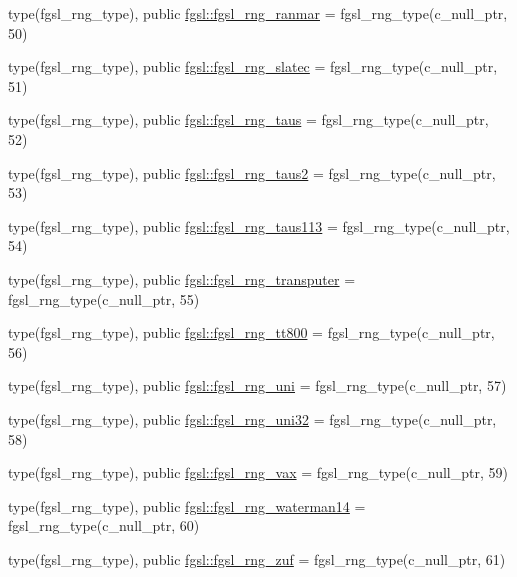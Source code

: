 \begin{DoxyCompactItemize}
type(fgsl\+\_\+rng\+\_\+type), public \hyperlink{namespacefgsl_a099ffd8b436045a9bd570027a1406df4}{fgsl\+::fgsl\+\_\+rng\+\_\+ranmar} = fgsl\+\_\+rng\+\_\+type(c\+\_\+null\+\_\+ptr, 50)
\item 
type(fgsl\+\_\+rng\+\_\+type), public \hyperlink{namespacefgsl_aa8d0035b0617f463167b9fce7aeedd26}{fgsl\+::fgsl\+\_\+rng\+\_\+slatec} = fgsl\+\_\+rng\+\_\+type(c\+\_\+null\+\_\+ptr, 51)
\item 
type(fgsl\+\_\+rng\+\_\+type), public \hyperlink{namespacefgsl_a9fe9a6cae0f833d90b9c22d644165758}{fgsl\+::fgsl\+\_\+rng\+\_\+taus} = fgsl\+\_\+rng\+\_\+type(c\+\_\+null\+\_\+ptr, 52)
\item 
type(fgsl\+\_\+rng\+\_\+type), public \hyperlink{namespacefgsl_a49b9837652787069b7179152078a6c9d}{fgsl\+::fgsl\+\_\+rng\+\_\+taus2} = fgsl\+\_\+rng\+\_\+type(c\+\_\+null\+\_\+ptr, 53)
\item 
type(fgsl\+\_\+rng\+\_\+type), public \hyperlink{namespacefgsl_a4b4cf5cdf021417e3147d6efff412544}{fgsl\+::fgsl\+\_\+rng\+\_\+taus113} = fgsl\+\_\+rng\+\_\+type(c\+\_\+null\+\_\+ptr, 54)
\item 
type(fgsl\+\_\+rng\+\_\+type), public \hyperlink{namespacefgsl_ae6f6fd654d8c94d4ff5cf3a3eb274ccb}{fgsl\+::fgsl\+\_\+rng\+\_\+transputer} = fgsl\+\_\+rng\+\_\+type(c\+\_\+null\+\_\+ptr, 55)
\item 
type(fgsl\+\_\+rng\+\_\+type), public \hyperlink{namespacefgsl_a1ec0bdbcac349e419b11ccb34d994e2d}{fgsl\+::fgsl\+\_\+rng\+\_\+tt800} = fgsl\+\_\+rng\+\_\+type(c\+\_\+null\+\_\+ptr, 56)
\item 
type(fgsl\+\_\+rng\+\_\+type), public \hyperlink{namespacefgsl_aaa640575921c58278aa5f851482cd072}{fgsl\+::fgsl\+\_\+rng\+\_\+uni} = fgsl\+\_\+rng\+\_\+type(c\+\_\+null\+\_\+ptr, 57)
\item 
type(fgsl\+\_\+rng\+\_\+type), public \hyperlink{namespacefgsl_a762bd46602bef4b69b29c76cbb184687}{fgsl\+::fgsl\+\_\+rng\+\_\+uni32} = fgsl\+\_\+rng\+\_\+type(c\+\_\+null\+\_\+ptr, 58)
\item 
type(fgsl\+\_\+rng\+\_\+type), public \hyperlink{namespacefgsl_a85a32537847b642a47c056213ad0c1a6}{fgsl\+::fgsl\+\_\+rng\+\_\+vax} = fgsl\+\_\+rng\+\_\+type(c\+\_\+null\+\_\+ptr, 59)
\item 
type(fgsl\+\_\+rng\+\_\+type), public \hyperlink{namespacefgsl_a47b92bfccacd568a2f9c08efbc2cb660}{fgsl\+::fgsl\+\_\+rng\+\_\+waterman14} = fgsl\+\_\+rng\+\_\+type(c\+\_\+null\+\_\+ptr, 60)
\item 
type(fgsl\+\_\+rng\+\_\+type), public \hyperlink{namespacefgsl_a43051f5642335d5741ab956a7c9cdb64}{fgsl\+::fgsl\+\_\+rng\+\_\+zuf} = fgsl\+\_\+rng\+\_\+type(c\+\_\+null\+\_\+ptr, 61)

\end{DoxyCompactItemize}
